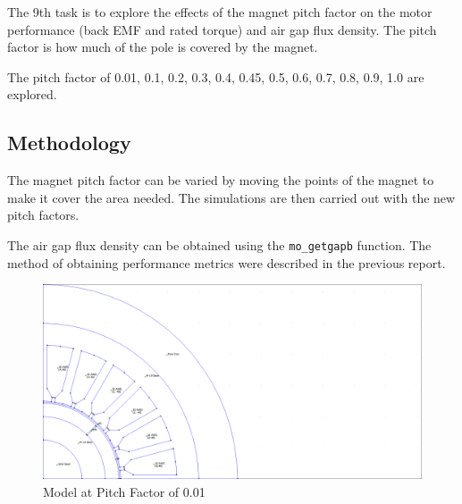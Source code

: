 \documentclass[12pt]{article}
\begin{document}
The 9th task is to explore the effects of the magnet pitch factor on the motor performance (back EMF and rated torque) and air gap flux density. The pitch factor is how much of the pole is covered by the magnet.

The pitch factor of 0.01, 0.1, 0.2, 0.3, 0.4, 0.45, 0.5, 0.6, 0.7, 0.8, 0.9, 1.0 are explored.

\subsection{Methodology}

The magnet pitch factor can be varied by moving the points of the magnet to make it cover the area needed. The simulations are then carried out with the new pitch factors. 

The air gap flux density can be obtained using the \lstinline{mo_getgapb} function. The method of obtaining performance metrics were described in the previous report.

\begin{figure}[H]
    \centering
    \includegraphics[height=0.8\linewidth, trim={0 0 30cm 1}, clip]{img/task_9_models/task_9_0.01.png}
    \caption{Model at Pitch Factor of 0.01}
    \label{fig:task-9-0.01-pf}
\end{figure}
\end{document}

